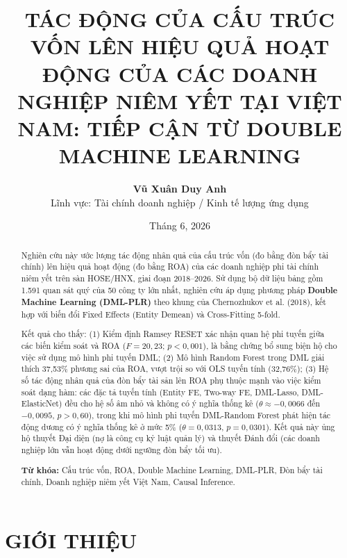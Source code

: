 \documentclass[12pt,a4paper]{article}
\title{\textbf{TÁC ĐỘNG CỦA CẤU TRÚC VỐN LÊN HIỆU QUẢ HOẠT ĐỘNG CỦA CÁC DOANH NGHIỆP NIÊM YẾT TẠI VIỆT NAM: TIẾP CẬN TỪ DOUBLE MACHINE LEARNING}}
\author{\textbf{Vũ Xuân Duy Anh} \\ Lĩnh vực: Tài chính doanh nghiệp / Kinh tế lượng ứng dụng}
\date{Tháng 6, 2026}
\begin{document}
\maketitle

\begin{abstract}
Nghiên cứu này ước lượng tác động nhân quả của cấu trúc vốn (đo bằng đòn bẩy tài chính) lên hiệu quả hoạt động (đo bằng ROA) của các doanh nghiệp phi tài chính niêm yết trên sàn HOSE/HNX, giai đoạn 2018--2026. Sử dụng bộ dữ liệu bảng gồm 1.591 quan sát quý của 50 công ty lớn nhất, nghiên cứu áp dụng phương pháp \textbf{Double Machine Learning (DML-PLR)} theo khung của Chernozhukov et al. (2018), kết hợp với biến đổi Fixed Effects (Entity Demean) và Cross-Fitting 5-fold.

Kết quả cho thấy: (1) Kiểm định Ramsey RESET xác nhận quan hệ phi tuyến giữa các biến kiểm soát và ROA ($F = 20,23$; $p < 0,001$), là bằng chứng bổ sung biện hộ cho việc sử dụng mô hình phi tuyến DML; (2) Mô hình Random Forest trong DML giải thích 37,53\% phương sai của ROA, vượt trội so với OLS tuyến tính (32,76\%); (3) Hệ số tác động nhân quả của đòn bẩy tài sản lên ROA phụ thuộc mạnh vào việc kiểm soát dạng hàm: các đặc tả tuyến tính (Entity FE, Two-way FE, DML-Lasso, DML-ElasticNet) đều cho hệ số âm nhỏ và không có ý nghĩa thống kê ($\theta \approx -0,0066$ đến $-0,0095$, $p > 0,60$), trong khi mô hình phi tuyến DML-Random Forest phát hiện tác động dương có ý nghĩa thống kê ở mức 5\% ($\theta = 0,0313$, $p = 0,0301$). Kết quả này ủng hộ thuyết Đại diện (nợ là công cụ kỷ luật quản lý) và thuyết Đánh đổi (các doanh nghiệp lớn vẫn hoạt động dưới ngưỡng đòn bẩy tối ưu).

\textbf{Từ khóa:} Cấu trúc vốn, ROA, Double Machine Learning, DML-PLR, Đòn bẩy tài chính, Doanh nghiệp niêm yết Việt Nam, Causal Inference.
\end{abstract}

\newpage

\section{GIỚI THIỆU}
\end{document}
